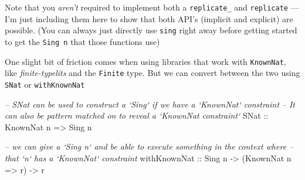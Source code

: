 \documentclass[]{article}
\newenvironment{Shaded}{}{}
\newcommand{\KeywordTok}[1]{\textcolor[rgb]{0.00,0.44,0.13}{\textbf{#1}}}
\newcommand{\DataTypeTok}[1]{\textcolor[rgb]{0.56,0.13,0.00}{#1}}
\newcommand{\CommentTok}[1]{\textcolor[rgb]{0.38,0.63,0.69}{\textit{#1}}}
\newcommand{\OtherTok}[1]{\textcolor[rgb]{0.00,0.44,0.13}{#1}}
\newcommand{\FunctionTok}[1]{\textcolor[rgb]{0.02,0.16,0.49}{#1}}
\newcommand{\NormalTok}[1]{#1}
\begin{document}
\begin{Shaded}
\end{Shaded}

Note that you \emph{aren't} required to implement both a \texttt{replicate\_}
and \texttt{replicate} --- I'm just including them here to show that both API's
(implicit and explicit) are possible. (You can always just directly use
\texttt{sing} right away before getting started to get the \texttt{Sing\ n} that
those functions use)

One slight bit of friction comes when using libraries that work with
\texttt{KnownNat}, like \emph{finite-typelits} and the \texttt{Finite} type. But
we can convert between the two using \texttt{SNat} or \texttt{withKnownNat}

\begin{Shaded}
\begin{Highlighting}[]
\CommentTok{-- SNat can be used to construct a `Sing` if we have a `KnownNat` constraint}
\CommentTok{-- It can also be pattern matched on to reveal a `KnownNat constraint`}
\DataTypeTok{SNat}\OtherTok{ ::} \DataTypeTok{KnownNat}\NormalTok{ n }\OtherTok{=>} \DataTypeTok{Sing}\NormalTok{ n}

\CommentTok{-- we can give a `Sing n` and be able to execute something in the context where}
\CommentTok{-- that `n` has a `KnownNat` constraint}
\OtherTok{withKnownNat ::} \DataTypeTok{Sing}\NormalTok{ n }\OtherTok{->}\NormalTok{ (}\DataTypeTok{KnownNat}\NormalTok{ n }\OtherTok{=>}\NormalTok{ r) }\OtherTok{->}\NormalTok{ r}
\end{Highlighting}
\end{Shaded}
\end{document}
